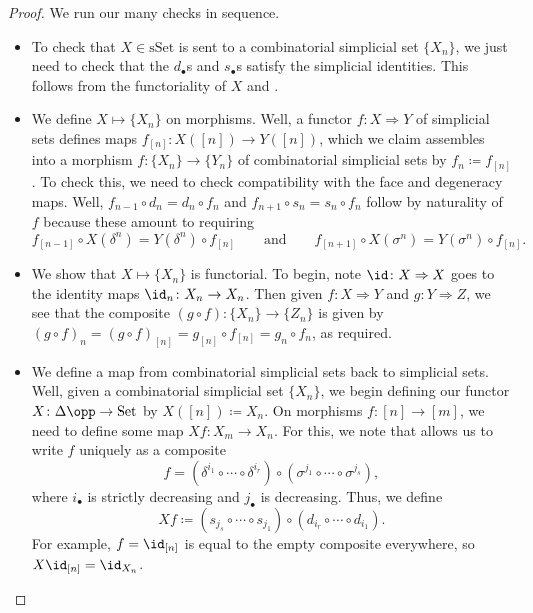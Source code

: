 \documentclass[../notes.tex]{subfiles}
\begin{document}
\begin{proof}
	We run our many checks in sequence.
	\begin{itemize}
		\item To check that $X\in\mathrm{sSet}$ is sent to a combinatorial simplicial set $\{X_n\}$, we just need to check that the $d_\bullet$s and $s_\bullet$s satisfy the simplicial identities. This follows from the functoriality of $X$ and .

		\item We define $X\mapsto\{X_n\}$ on morphisms. Well, a functor $f\colon X\Rightarrow Y$ of simplicial sets defines maps $f_{[n]}\colon X([n])\to Y([n])$, which we claim assembles into a morphism $f\colon\{X_n\}\to\{Y_n\}$ of combinatorial simplicial sets by $f_n\coloneqq f_{[n]}$. To check this, we need to check compatibility with the face and degeneracy maps. Well, $f_{n-1}\circ d_n=d_n\circ f_n$ and $f_{n+1}\circ s_n=s_n\circ f_n$ follow by naturality of $f$ because these amount to requiring
		\[f_{[n-1]}\circ X(\delta^n)=Y(\delta^n)\circ f_{[n]}\qquad\text{and}\qquad f_{[n+1]}\circ X(\sigma^n)=Y(\sigma^n)\circ f_{[n]}.\]

		\item We show that $X\mapsto\{X_n\}$ is functorial. To begin, note $\id\colon X\Rightarrow X$ goes to the identity maps $\id_n\colon X_n\to X_n$. Then given $f\colon X\Rightarrow Y$ and $g\colon Y\Rightarrow Z$, we see that the composite $(g\circ f)\colon\{X_n\}\to\{Z_n\}$ is given by $(g\circ f)_n=(g\circ f)_{[n]}= g_{[n]}\circ f_{[n]}=g_n\circ f_n$, as required.

		\item We define a map from combinatorial simplicial sets back to simplicial sets. Well, given a combinatorial simplicial set $\{X_n\}$, we begin defining our functor $X\colon\Delta\opp\to\mathrm{Set}$ by $X([n])\coloneqq X_n$. On morphisms $f\colon[n]\to[m]$, we need to define some map $Xf\colon X_m\to X_n$. For this, we note that  allows us to write $f$ uniquely as a composite
		\[f=(\delta^{i_1}\circ\cdots\circ\delta^{i_r})\circ(\sigma^{j_1}\circ\cdots\circ\sigma^{j_s}),\]
		where $i_\bullet$ is strictly decreasing and $j_\bullet$ is decreasing. Thus, we define
		\[Xf\coloneqq(s_{j_s}\circ\cdots\circ s_{j_1})\circ(d_{i_r}\circ\cdots\circ d_{i_1}).\]
		For example, $f=\id_{[n]}$ is equal to the empty composite everywhere, so $X{\id_{[n]}}=\id_{X_n}$.


\end{itemize}
\end{proof}
\end{document}
